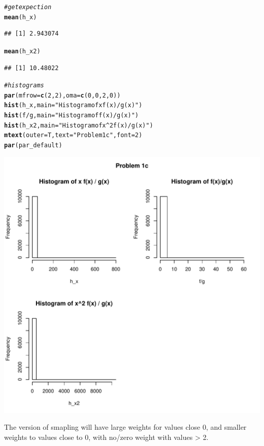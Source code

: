 \documentclass{article}\usepackage[]{graphicx}\usepackage[]{color}
\makeatletter
\def\maxwidth{ %
  \ifdim\Gin@nat@width>\linewidth
    \linewidth
  \else
    \Gin@nat@width
  \fi
}
\newcommand{\hlnum}[1]{\textcolor[rgb]{0.686,0.059,0.569}{#1}}%
\newcommand{\hlstr}[1]{\textcolor[rgb]{0.192,0.494,0.8}{#1}}%
\newcommand{\hlcom}[1]{\textcolor[rgb]{0.678,0.584,0.686}{\textit{#1}}}%
\newcommand{\hlopt}[1]{\textcolor[rgb]{0,0,0}{#1}}%
\newcommand{\hlstd}[1]{\textcolor[rgb]{0.345,0.345,0.345}{#1}}%
\newcommand{\hlkwc}[1]{\textcolor[rgb]{0.333,0.667,0.333}{#1}}%
\newcommand{\hlkwd}[1]{\textcolor[rgb]{0.737,0.353,0.396}{\textbf{#1}}}%
\newenvironment{kframe}{%
 \def\at@end@of@kframe{}%
 \ifinner\ifhmode%
  \def\at@end@of@kframe{\end{minipage}}%
  \begin{minipage}{\columnwidth}%
 \fi\fi%
 \def\FrameCommand##1{\hskip\@totalleftmargin \hskip-\fboxsep
 \colorbox{shadecolor}{##1}\hskip-\fboxsep
     \hskip-\linewidth \hskip-\@totalleftmargin \hskip\columnwidth}%
 \MakeFramed {\advance\hsize-\width
   \@totalleftmargin\z@ \linewidth\hsize
   \@setminipage}}%
 {\par\unskip\endMakeFramed%
 \at@end@of@kframe}
\newenvironment{knitrout}{}{} %
\makeatother
\begin{document}
\begin{knitrout}
\begin{kframe}
\begin{alltt}
\hlcom{#get expection}
\hlkwd{mean}\hlstd{(h_x)}
\end{alltt}
\begin{verbatim}
## [1] 2.943074
\end{verbatim}
\begin{alltt}
\hlkwd{mean}\hlstd{(h_x2)}
\end{alltt}
\begin{verbatim}
## [1] 10.48022
\end{verbatim}
\begin{alltt}
\hlcom{#histograms}
\hlkwd{par}\hlstd{(}\hlkwc{mfrow} \hlstd{=} \hlkwd{c}\hlstd{(}\hlnum{2}\hlstd{,} \hlnum{2}\hlstd{),} \hlkwc{oma} \hlstd{=} \hlkwd{c}\hlstd{(}\hlnum{0}\hlstd{,} \hlnum{0}\hlstd{,} \hlnum{2}\hlstd{,} \hlnum{0}\hlstd{))}
\hlkwd{hist}\hlstd{(h_x,} \hlkwc{main} \hlstd{=} \hlstr{"Histogram of x f(x) / g(x)"}\hlstd{)}
\hlkwd{hist}\hlstd{(f} \hlopt{/} \hlstd{g,} \hlkwc{main} \hlstd{=} \hlstr{"Histogram of f(x)/g(x)"}\hlstd{)}
\hlkwd{hist}\hlstd{(h_x2,} \hlkwc{main} \hlstd{=} \hlstr{"Histogram of x^2 f(x) / g(x)"}\hlstd{)}
\hlkwd{mtext}\hlstd{(}\hlkwc{outer} \hlstd{= T,} \hlkwc{text} \hlstd{=} \hlstr{"Problem 1c"}\hlstd{,} \hlkwc{font} \hlstd{=} \hlnum{2}\hlstd{)}
\hlkwd{par}\hlstd{(par_default)}
\end{alltt}
\end{kframe}
\includegraphics[width=\maxwidth]{figure/unnamed-chunk-3-1} 

\end{knitrout}
The version of smapling will have large weights for values close 0, and smaller weights to values close to 0, with no/zero weight with values > 2.
\end{document}

